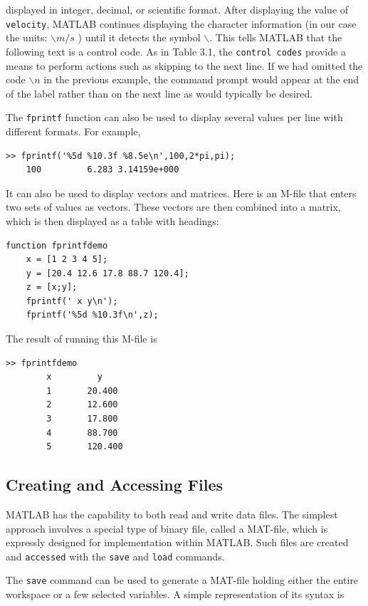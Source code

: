 \documentclass[../main.tex]{subfiles}
\begin{document}
displayed in integer, decimal, or scientific format. After displaying the value of \texttt{velocity},
MATLAB continues displaying the character information (in our case the units: \texttt{$\backslash m/s$} ) until
it detects the symbol $\backslash$. This tells MATLAB that the following text is a control code. As in
Table 3.1, the \texttt{control codes} provide a means to perform actions such as skipping to the
next line. If we had omitted the code \texttt{$\backslash n$} in the previous example, the command prompt
would appear at the end of the label  rather than on the next line as would typically be
desired.


The \texttt{fprintf} function can also be used to display several values per line with different formats. For example,
\begin{lstlisting}[frame=none, numbers=none]
    >> fprintf('%5d %10.3f %8.5e\n',100,2*pi,pi);
    100         6.283 3.14159e+000
\end{lstlisting}
It can also be used to display vectors and matrices. Here is an M-file that enters two
sets of values as vectors. These vectors are then combined into a matrix, which is then displayed as a table with headings:
\begin{lstlisting}[frame=none, numbers=none]
    function fprintfdemo
    x = [1 2 3 4 5];
    y = [20.4 12.6 17.8 88.7 120.4];
    z = [x;y];
    fprintf(' x y\n');
    fprintf('%5d %10.3f\n',z);
\end{lstlisting}
The result of running this M-file is
\begin{lstlisting}[frame=none, numbers=none]
    >> fprintfdemo
        x         y
        1       20.400
        2       12.600
        3       17.800
        4       88.700
        5       120.400
\end{lstlisting}


\subsection{Creating and Accessing Files}

MATLAB has the capability to both read and write data files. The simplest approach involves a special type of binary file, called a MAT-file, which is expressly designed for
implementation within MATLAB. Such files are created and \texttt{accessed} with the \texttt{save} and
\texttt{load} commands.


The \texttt{save} command can be used to generate a MAT-file holding either the entire workspace 
or a few selected variables. A simple representation of its syntax is
\end{document}
